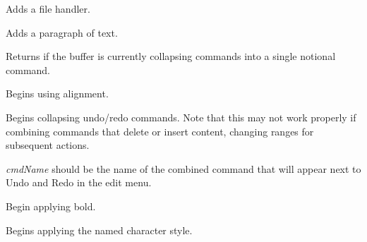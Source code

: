 \label{wxrichtextbufferaddhandler}


Adds a file handler.

\label{wxrichtextbufferaddparagraph}


Adds a paragraph of text.

\label{wxrichtextbufferbatchingundo}


Returns \true if the buffer is currently collapsing commands into a single notional command.

\label{wxrichtextbufferbeginalignment}


Begins using alignment.

\label{wxrichtextbufferbeginbatchundo}


Begins collapsing undo/redo commands. Note that this may not work properly
if combining commands that delete or insert content, changing ranges for
subsequent actions.

{\it cmdName} should be the name of the combined command that will appear
next to Undo and Redo in the edit menu.

\label{wxrichtextbufferbeginbold}


Begin applying bold.

\label{wxrichtextbufferbegincharacterstyle}


Begins applying the named character style.

\label{wxrichtextbufferbeginfont}


